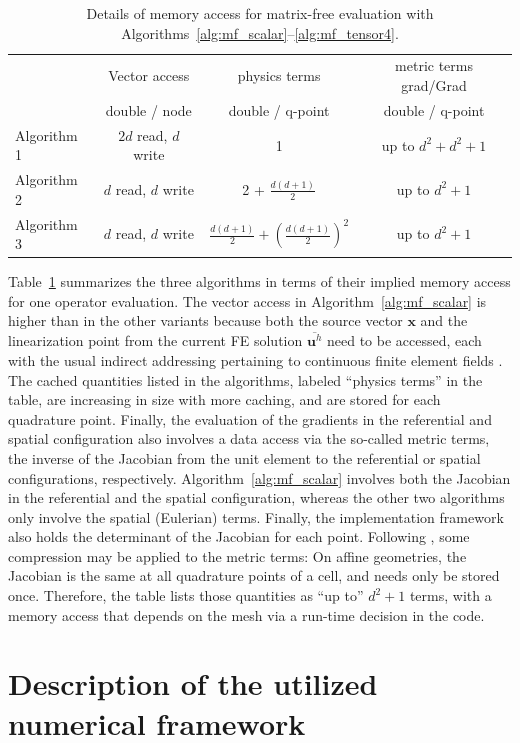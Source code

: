 \documentclass[AMA,STIX1COL]{WileyNJD-v2}
\newcommand*{\gz}[1]{\boldsymbol{#1}}
\begin{document}
\begin{table}
\centering
\caption{Details of memory access for matrix-free evaluation with Algorithms~\ref{alg:mf_scalar}--\ref{alg:mf_tensor4}.}
\label{tab:memory}
\begin{tabular}{|l|ccc|}
\hline
 & Vector access & physics terms & metric terms grad/Grad \\
 & double / node & double / q-point & double / q-point \\
 \hline
Algorithm 1 & $2d$ read, $d$ write & 1 & up to $d^2 + d^2 + 1$\\
Algorithm 2 & $d$ read, $d$ write & 2 + $\frac{d(d+1)}{2}$ & up to $d^2+1$\\
Algorithm 3 & $d$ read, $d$ write & $\frac{d(d+1)}{2}+\left(\frac{d(d+1)}{2}\right)^2$ & up to $d^2+1$\\
\hline
\end{tabular}
\end{table}

{\color{red}
Table~\ref{tab:memory} summarizes the three algorithms in terms of their implied
memory access for one operator evaluation. The vector access in
Algorithm~\ref{alg:mf_scalar} is higher than in the other variants because both
the source vector $\gz x$ and the linearization point from the current FE
solution $\overline{\gz u^h}$ need to be accessed, each with the usual indirect
addressing pertaining to continuous finite element fields \cite{kronbichler12}.
The cached quantities listed in the algorithms, labeled ``physics terms'' in the
table, are increasing in size with more caching, and are stored for each
quadrature point. Finally, the evaluation of the gradients in the referential
and spatial configuration also involves a data access via the so-called metric
terms, the inverse of the Jacobian from the unit element to the referential or
spatial configurations, respectively. Algorithm~\ref{alg:mf_scalar} involves
both the Jacobian in the referential and the spatial configuration, whereas the other
two algorithms only involve the spatial (Eulerian) terms. Finally, the
implementation framework also holds the determinant of the Jacobian for each
point. Following \cite{kronbichler12}, some compression may be applied to the
metric terms: On affine geometries, the Jacobian is the same at all quadrature
points of a cell, and needs only be stored once. Therefore, the table lists
those quantities as ``up to'' $d^2+1$ terms, with a memory access that depends
on the mesh via a run-time decision in the code.
}

\section{Description of the utilized numerical framework}
\label{sec:framework}
\end{document}
